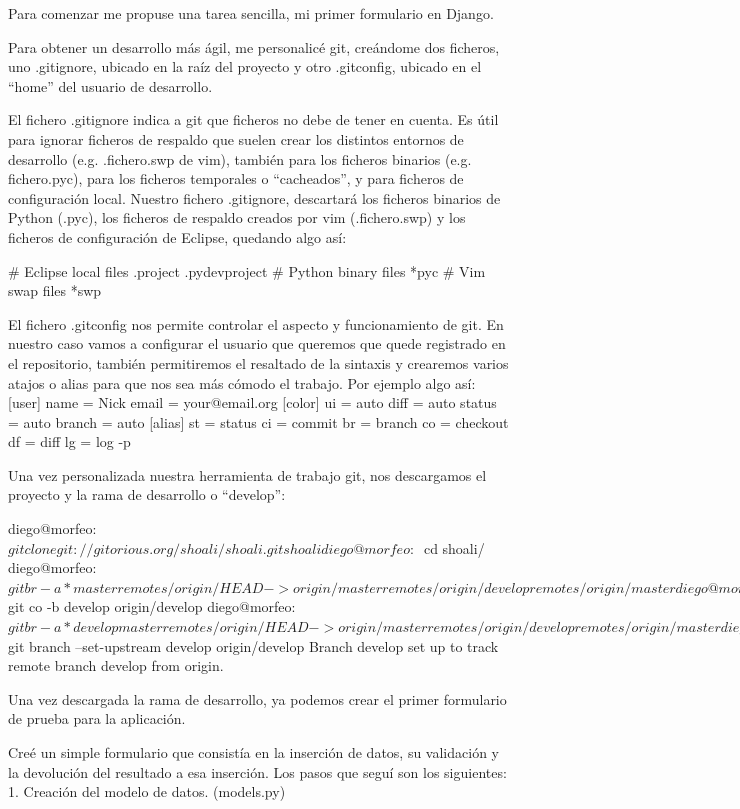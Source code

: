\documentclass[a4paper, 12pt]{book}
\begin{document}
Para comenzar me propuse una tarea sencilla, mi primer formulario en Django.

Para obtener un desarrollo más ágil, me personalicé git, creándome dos ficheros, uno .gitignore, ubicado en la raíz del proyecto y otro .gitconfig, ubicado en el “home” del usuario de desarrollo.

El fichero .gitignore indica a git que ficheros no debe de tener en cuenta. Es útil para ignorar ficheros de respaldo que suelen crear los distintos entornos de desarrollo (e.g. .fichero.swp de vim), también para los ficheros binarios (e.g. fichero.pyc), para los ficheros temporales o “cacheados”, y para ficheros de configuración local. Nuestro fichero .gitignore, descartará los ficheros binarios de Python (.pyc), los ficheros de respaldo creados por vim (.fichero.swp) y los ficheros de configuración de Eclipse, quedando algo así:

# Eclipse local files
.project
.pydevproject
# Python binary files
*pyc
# Vim swap files
*swp

El fichero .gitconfig nos permite controlar el aspecto y funcionamiento de git. En nuestro caso vamos a configurar el usuario que queremos que quede registrado en el repositorio, también permitiremos el resaltado de la sintaxis y crearemos varios atajos o alias para que nos sea más cómodo el trabajo. Por ejemplo algo así:
[user]
name = Nick
email = your@email.org
[color]
ui = auto
    diff = auto
    status = auto
    branch = auto
[alias]
st = status
ci = commit
br = branch
co = checkout
df = diff
lg = log -p

Una vez personalizada nuestra herramienta de trabajo git, nos descargamos el proyecto y la rama de desarrollo o “develop”:

diego@morfeo:~$ git clone git://gitorious.org/shoali/shoali.git shoali
diego@morfeo:~$ cd shoali/
diego@morfeo:~$ git br -a
* master
  remotes/origin/HEAD -> origin/master
  remotes/origin/develop
  remotes/origin/master
diego@morfeo:~$ git co -b develop origin/develop
diego@morfeo:~$ git br -a
* develop
  master
  remotes/origin/HEAD -> origin/master
  remotes/origin/develop
  remotes/origin/master
diego@morfeo:~$ git branch --set-upstream develop origin/develop
Branch develop set up to track remote branch develop from origin.

Una vez descargada la rama de desarrollo, ya podemos crear el primer formulario de prueba para la aplicación.

Creé un simple formulario que consistía en la inserción de datos, su validación y la devolución del resultado a esa inserción. Los pasos que seguí son los siguientes:
1. Creación del modelo de datos. (models.py)
\end{document}
